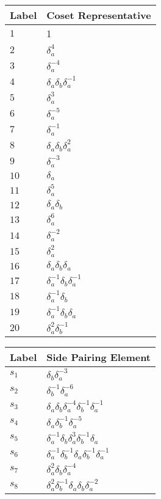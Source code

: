\documentclass{article}
\begin{document}
\begin{center}
\begin{tabular}{ll}
\toprule
Label & Coset Representative\\
\midrule
$1$ & 1 \\
$2$ & $\delta_a^{4}$ \\
$3$ & $\delta_a^{-4}$ \\
$4$ & $\delta_a^{}\delta_b^{}\delta_a^{-1}$ \\
$5$ & $\delta_a^{3}$ \\
$6$ & $\delta_a^{-5}$ \\
$7$ & $\delta_a^{-1}$ \\
$8$ & $\delta_a^{}\delta_b^{}\delta_a^{2}$ \\
$9$ & $\delta_a^{-3}$ \\
$10$ & $\delta_a^{}$ \\
$11$ & $\delta_a^{5}$ \\
$12$ & $\delta_a^{}\delta_b^{}$ \\
$13$ & $\delta_a^{6}$ \\
$14$ & $\delta_a^{-2}$ \\
$15$ & $\delta_a^{2}$ \\
$16$ & $\delta_a^{}\delta_b^{}\delta_a^{}$ \\
$17$ & $\delta_a^{-1}\delta_b^{}\delta_a^{-1}$ \\
$18$ & $\delta_a^{-1}\delta_b^{}$ \\
$19$ & $\delta_a^{-1}\delta_b^{}\delta_a^{}$ \\
$20$ & $\delta_a^{2}\delta_b^{-1}$ \\
\bottomrule
\end{tabular}
\hfill
\begin{tabular}{ll}
\toprule
Label & Side Pairing Element\\
\midrule
$s_{1}$ & $\delta_b^{}\delta_a^{-3}$ \\
$s_{2}$ & $\delta_b^{-1}\delta_a^{-6}$ \\
$s_{3}$ & $\delta_a^{}\delta_b^{}\delta_a^{-4}\delta_b^{-1}\delta_a^{-1}$ \\
$s_{4}$ & $\delta_a^{}\delta_b^{-1}\delta_a^{-5}$ \\
$s_{5}$ & $\delta_a^{-1}\delta_b^{}\delta_a^{3}\delta_b^{-1}\delta_a^{}$ \\
$s_{6}$ & $\delta_a^{-1}\delta_b^{-1}\delta_a^{}\delta_b^{-1}\delta_a^{-1}$ \\
$s_{7}$ & $\delta_a^{2}\delta_b^{}\delta_a^{-4}$ \\
$s_{8}$ & $\delta_a^{2}\delta_b^{-1}\delta_a^{}\delta_b^{}\delta_a^{-2}$ \\

\end{tabular}
\end{center}
\end{document}
